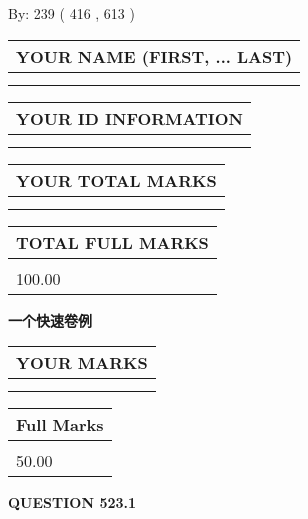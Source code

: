 \documentclass{ctexart}
\begin{document}
   
\hspace{1.0in} By: 
 239 ( 416 ,  613 )
   
   
   
   
\newpage 
\setcounter{page}{ 
   523001 } 
   
   
   
   
\noindent\begin{tabular}{|l|}
\hline
YOUR NAME (FIRST, ... LAST)  \\
\hline
 \\ 
 \\ 
\hline
\end{tabular}
\hspace{0.05in} \begin{tabular}{|l|}
\hline
 YOUR   ID   INFORMATION  \\
\hline
 \\ 
 \\ 
\hline
\end{tabular}
   
   
\vspace{0.2in}\noindent\begin{tabular}{|l|}
\hline
YOUR TOTAL MARKS  \\
\hline
 \\ 
 \\ 
\hline
\end{tabular}
\hspace{0.05in} \begin{tabular}{|l|}
\hline
TOTAL FULL MARKS  \\
\hline
 \\ 
100.00 \\
\hline
\end{tabular}
   
   
 \vspace{0.2in}
{\LARGE {\textbf{ 一个快速卷例}}}
   
   
  
\vspace{0.2in}
  
\noindent\begin{tabular}{|l|}
\hline
 YOUR MARKS  \\
\hline
 \\ 
 \\ 
\hline
\end{tabular}
\hspace{0.05in} \begin{tabular}{|l|}
\hline
 Full Marks  \\
\hline
 \\ 
50.00 \\
\hline
\end{tabular}
{\textbf{\Large{QUESTION
523.1 
}}}
  
\end{document}
